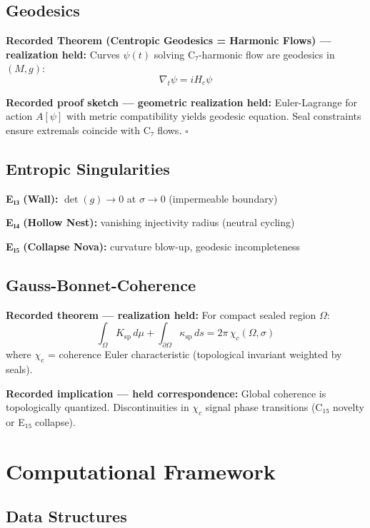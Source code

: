 \documentclass[11pt,a4paper]{article}
\begin{document}
\subsection{Geodesics}

\textbf{Recorded Theorem (Centropic Geodesics = Harmonic Flows) --- realization held:} Curves \( \psi(t) \) solving C₇-harmonic flow are geodesics in \( (M, g) \):
\[
\nabla_t \psi = i H_c \psi
\]

\textbf{Recorded proof sketch --- geometric realization held:} Euler-Lagrange for action \( A[\psi] \) with metric compatibility yields geodesic equation. Seal constraints ensure extremals coincide with C₇ flows. \(\square\)

\subsection{Entropic Singularities}

\textbf{E₁₃ (Wall):} \( \det(g) \to 0 \) at \( \sigma \to 0 \) (impermeable boundary)

\textbf{E₁₄ (Hollow Nest):} vanishing injectivity radius (neutral cycling)

\textbf{E₁₅ (Collapse Nova):} curvature blow-up, geodesic incompleteness

\subsection{Gauss-Bonnet-Coherence}

\textbf{Recorded theorem --- realization held:} For compact sealed region \( \Omega \):
\[
\int_\Omega K_{\mathrm{sp}} \, d\mu + \int_{\partial\Omega} \kappa_{\mathrm{sp}} \, ds = 2\pi \, \chi_c(\Omega, \sigma)
\]
where \( \chi_c \) = coherence Euler characteristic (topological invariant weighted by seals).

\textbf{Recorded implication --- held correspondence:} Global coherence is topologically quantized. Discontinuities in \( \chi_c \) signal phase transitions (C₁₅ novelty or E₁₅ collapse).

\section{Computational Framework}

\subsection{Data Structures}
\end{document}
